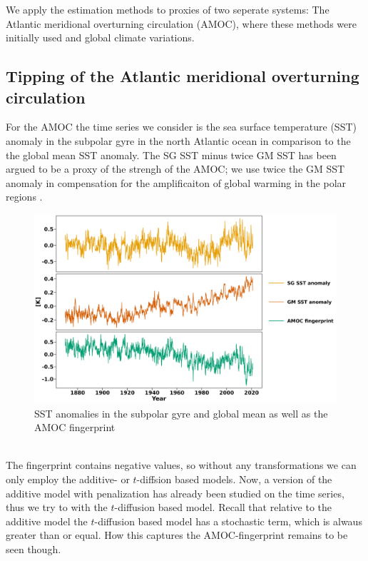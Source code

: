 We apply the estimation methods to proxies of two seperate systems: The Atlantic meridional overturning circulation (AMOC), where these methods were initially used \cite{Ditlevsen2023} and global climate variations.
\subsection{Tipping of the Atlantic meridional overturning circulation}
For the AMOC the time series we consider is the sea surface temperature (SST) anomaly in the subpolar gyre in the north Atlantic ocean in comparison to the the global mean SST anomaly. The SG SST minus twice GM SST has been argued to be a proxy of the strengh of the AMOC; we use twice the GM SST anomaly in compensation for the amplificaiton of global warming in the polar regions \cite[caption of figure 1]{Ditlevsen2023}.
\begin{figure}[h!]
    \begin{center}
    \includegraphics[scale = .075]{figures/AMOC_data_plot.jpeg}
    \caption{SST anomalies in the subpolar gyre and global mean as well as the AMOC fingerprint}
    \label{figure:AMOC_plot}
    \end{center}
\end{figure}\\
The fingerprint contains negative values, so without any transformations we can only employ the additive- or $t$-diffsion based models. Now, a version of the additive model with penalization has already been studied on the time series, thus we try to with the $t$-diffusion based model. Recall that relative to the additive model the $t$-diffusion based model has a stochastic term, which is alwaus greater than or equal. How this captures the AMOC-fingerprint remains to be seen though.
